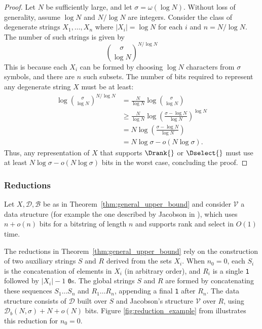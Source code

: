 \begin{proof}
    Let $N$ be sufficiently large, and let $\sigma = \omega(\log N)$. Without loss of generality, assume $\log N$ and $N / \log N$ are integers. Consider the class of degenerate strings $X_1, \ldots, X_n$ where $|X_i| = \log N$ for each $i$ and $n = N / \log N$. The number of such strings is given by
    \begin{equation}
        \binom{\sigma}{\log N}^{N / \log N}
    \end{equation}
    This is because each $X_i$ can be formed by choosing $\log N$ characters from $\sigma$ symbols, and there are $n$ such subsets. The number of bits required to represent any degenerate string $X$ must be at least:
    \begin{align*}
        \log \binom{\sigma}{\log N}^{N / \log N} & = \frac{N}{\log N} \log \binom{\sigma}{\log N}                                    \\
                                                 & \geq \frac{N}{\log N} \log \left( \frac{\sigma - \log N}{\log N} \right)^{\log N} \\
                                                 & = N \log \left( \frac{\sigma - \log N}{\log N} \right)                            \\
                                                 & = N \log \sigma - o(N \log \sigma).
    \end{align*}
    Thus, any representation of $X$ that supports $\Drank{}$ or $\Dselect{}$ must use at least $N \log \sigma - o(N \log \sigma)$ bits in the worst case, concluding the proof.
\end{proof}

\subsubsection{Reductions}{\label{sec:reductions}}

Let $X, \mathcal{D}, \mathcal{B}$ be as in Theorem~\ref{thm:general_upper_bound} and consider $\mathcal{V}$ a data structure (for example the one described by Jacobson in \cite{Jacobson}), which uses $n +o(n)$ bits for a bitstring of length $n$ and supports \textsf{rank} and \textsf{select} in $O(1)$ time.

\noindent The reductions in Theorem~\ref{thm:general_upper_bound} rely on the construction of two auxiliary strings $S$ and $R$ derived from the sets $X_i$. When $n_0 = 0$, each $S_i$ is the concatenation of elements in $X_i$ (in arbitrary order), and $R_i$ is a single \texttt{1} followed by $|X_i| - 1$ \texttt{0}s. The global strings $S$ and $R$ are formed by concatenating these sequences $S_1 \dots S_n$ and $R_1 \dots R_n$, appending a final \texttt{1} after $R_n$. The data structure consists of $\mathcal{D}$ built over $S$ and Jacobson's structure $\mathcal{V}$ over $R$, using $\mathcal{D}_b(N,\sigma) + N + o(N)$ bits. Figure \ref{fig:reduction_example} from \cite{bille2023rank} illustrates this reduction for $n_0 = 0$.

